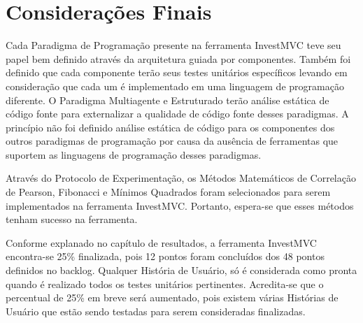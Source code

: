 \chapter{Considerações Finais}
Cada Paradigma de Programação presente na ferramenta InvestMVC teve seu papel bem definido através da arquitetura guiada por componentes. Também foi definido que cada componente terão seus testes unitários específicos levando em consideração que cada um é implementado em uma linguagem de programação diferente. O Paradigma Multiagente e Estruturado terão análise estática de código fonte para externalizar a qualidade de código fonte desses paradigmas. A princípio não foi definido análise estática de código para os componentes dos outros paradigmas de programação por causa da ausência de ferramentas que suportem as linguagens de programação desses paradigmas.

Através do Protocolo de Experimentação, os Métodos Matemáticos de Correlação de Pearson, Fibonacci e Mínimos Quadrados foram selecionados para serem implementados na ferramenta InvestMVC. Portanto, espera-se que esses métodos tenham sucesso na ferramenta.

Conforme explanado no capítulo de resultados, a ferramenta InvestMVC encontra-se 25\% finalizada, pois 12 pontos foram concluídos dos 48 pontos definidos no backlog. Qualquer História de Usuário, só é considerada como pronta quando é realizado todos os testes unitários pertinentes. Acredita-se que o percentual de 25\% em breve será aumentado, pois existem várias Histórias de Usuário que estão sendo testadas para serem consideradas finalizadas.
